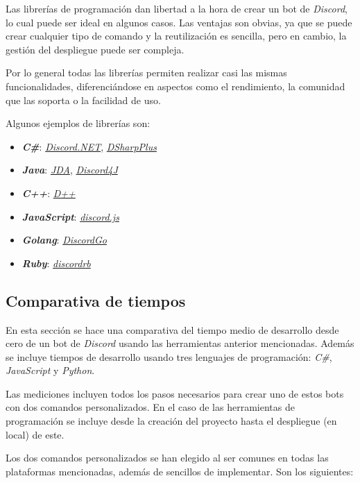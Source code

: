 Las librerías de programación dan libertad a la hora de crear un bot de \textit{Discord}, lo cual puede ser ideal en algunos casos. Las ventajas son obvias, ya que se puede crear cualquier tipo de comando y la reutilización es sencilla, pero en cambio, la gestión del despliegue puede ser compleja.

Por lo general todas las librerías permiten realizar casi las mismas funcionalidades, diferenciándose en aspectos como el rendimiento, la comunidad que las soporta o la facilidad de uso.

Algunos ejemplos de librerías son:

\begin{itemize}
	\item \textbf{\textit{C\#}}: \href{https://discordnet.dev/}{\textit{Discord.NET}}, \href{https://github.com/DSharpPlus/DSharpPlus}{\textit{DSharpPlus}}
	\item \textbf{\textit{Java}}: \href{https://github.com/DV8FromTheWorld/JDA}{\textit{JDA}}, \href{https://discord4j.com/}{\textit{Discord4J}}
	\item \textbf{\textit{C++}}: \href{https://dpp.dev/}{\textit{D++}}
	\item \textbf{\textit{JavaScript}}: \href{https://discord.js.org/}{\textit{discord.js}}
	\item \textbf{\textit{Golang}}: \href{https://github.com/bwmarrin/discordgo}{\textit{DiscordGo}}
	\item \textbf{\textit{Ruby}}: \href{https://github.com/shardlab/discordrb}{\textit{discordrb}}
\end{itemize}


\subsection{Comparativa de tiempos}

En esta sección se hace una comparativa del tiempo medio de desarrollo desde cero de un bot de \textit{Discord} usando las herramientas anterior mencionadas. Además se incluye tiempos de desarrollo usando tres lenguajes de programación: \textit{C\#}, \textit{JavaScript} y \textit{Python}.

Las mediciones incluyen todos los pasos necesarios para crear uno de estos bots con dos comandos personalizados. En el caso de las herramientas de programación se incluye desde la creación del proyecto hasta el despliegue (en local) de este.

Los dos comandos personalizados se han elegido al ser comunes en todas las plataformas mencionadas, además de sencillos de implementar. Son los siguientes:

